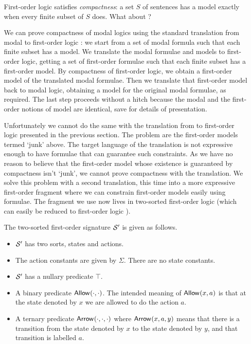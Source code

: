 \NI First-order logic satisfies \emph{compactness}: a set $S$ of sentences has a
model exactly when every finite subset of $S$ does. What about
\cathoristic{}?

We can prove compactness of modal logics using the standard
translation from modal to first-order logic \cite{BlackburnP:modlog}:
we start from a set of modal formula such that each finite subset has
a model. We translate the modal formulae and models to first-order
logic, getting a set of first-order formulae such that each finite
subset has a first-order model. By compactness of first-order logic, we
obtain a first-order model of the translated modal formulae. Then we
translate that first-order model back to modal logic, obtaining a
model for the original modal formulae, as required. The last step
proceeds without a hitch because the modal and the first-order notions
of model are identical, save for details of presentation.

Unfortunately we cannot do the same with the translation from
\cathoristic{} to first-order logic presented in the previous
section. The problem are the first-order models termed `junk' above.
The target language of the translation is not expressive enough to
have formulae that can guarantee such constraints.  As we have no
reason to believe that the first-order model whose existence is
guaranteed by compactness isn't `junk', we cannot prove compactness
with the translation.  We solve this problem with a second translation, this time
into a more expressive first-order fragment where we can constrain
first-order models easily using formulae. The fragment we use now
lives in two-sorted first-order logic (which can easily be reduced to
first-order logic \cite{EndertonHB:matinttl}).

\begin{definition}
The two-sorted first-order signature $\mathcal{S}'$ is given as follows.
\begin{itemize}

\item $\mathcal{S}'$ has two sorts, states and actions. 

\item The action constants are given by $\Sigma$. There
are no state constants. 

\item $\mathcal{S}'$ has a nullary predicate $\top$.

\item A binary predicate $\mathsf{Allow}^{}(\cdot, \cdot)$. The intended
  meaning of $\mathsf{Allow}^{}(x, a)$ is that at the state denoted by $x$ we
  are allowed to do the action $a$.

\item A ternary predicate $\mathsf{Arrow}^{}(\cdot, \cdot, \cdot)$ where
  $\mathsf{Arrow}^{}(x, a, y)$ means that there is a transition from the
  state denoted by $x$ to the state denoted by $y$, and that
  transition is labelled $a$.

\end{itemize}
\end{definition}

